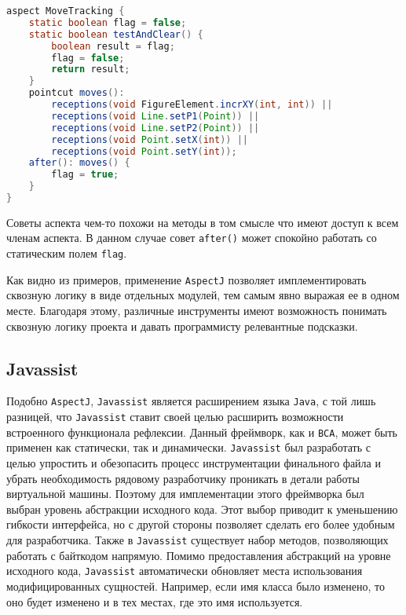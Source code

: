 \begin{lstlisting}[language=Java, caption={Аспект, отслеживающий изменения фигур.}]
aspect MoveTracking {
    static boolean flag = false;
    static boolean testAndClear() {
        boolean result = flag;
        flag = false;
        return result;
    }
    pointcut moves():
        receptions(void FigureElement.incrXY(int, int)) ||
        receptions(void Line.setP1(Point)) ||
        receptions(void Line.setP2(Point)) ||
        receptions(void Point.setX(int)) ||
        receptions(void Point.setY(int));
    after(): moves() {
        flag = true;
    }
}
\end{lstlisting}


Советы аспекта чем-то похожи на методы в том смысле что имеют доступ к всем членам аспекта. В данном случае совет \texttt{after()} может спокойно работать со статическим полем \texttt{flag}.

Как видно из примеров, применение \texttt{AspectJ} позволяет имплементировать сквозную логику в виде отдельных модулей, тем самым явно выражая ее в одном месте. Благодаря этому, различные инструменты имеют возможность понимать сквозную логику проекта и давать программисту релевантные подсказки.

\subsection{Javassist}

Подобно \texttt{AspectJ}, \texttt{Javassist} является расширением языка \texttt{Java}, с той лишь разницей, что \texttt{Javassist} ставит своей целью расширить возможности встроенного функционала рефлексии. Данный фреймворк, как и \texttt{BCA}, может быть применен как статически, так и динамически. \texttt{Javassist} был разработать с целью упростить и обезопасить процесс инструментации финального файла и убрать необходимость рядовому разработчику проникать в детали работы виртуальной машины. Поэтому для имплементации этого фреймворка был выбран уровень абстракции исходного кода. Этот выбор приводит к уменьшению гибкости интерфейса, но с другой стороны позволяет сделать его более удобным для разработчика. Также в \texttt{Javassist} существует набор методов, позволяющих работать с байткодом напрямую. Помимо предоставления абстракций на уровне исходного кода, \texttt{Javassist} автоматически обновляет места использования модифицированных сущностей. Например, если имя класса было изменено, то оно будет изменено и в тех местах, где это имя используется.

